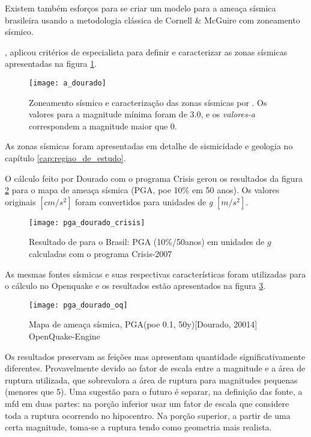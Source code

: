 Existem também esforços \citep{dourado_2014} para se criar um modelo para a ameaça sísmica brasileira
usando a metodologia clássica de Cornell \& McGuire com zoneamento sísmico. 

\citet{dourado_2014}, aplicou critérios de especialista para definir e caracterizar as zonas sísmicas
apresentadas na figura \ref{fig:a_dourado}.

\begin{figure}[H]
  \centering
  \texttt{[image: a\_dourado]} 
  \caption{Zoneamento sísmico e caracterização das zonas sísmicas por \citep{dourado_2014}.
  Os valores para a magnitude mínima foram de 3.0, e os \emph{valores-a} correspondem a magnitude maior que 0.}
  \label{fig:a_dourado} 
\end{figure}

As zonas sísmicas foram apresentadas em detalhe de sismicidade e geologia no capítulo \ref{cap:regiao_de_estudo}.

O cálculo feito por Dourado com o programa Crisis \citep{crisis_2007} gerou os resultados da figura \ref{fig:pga_dourado}
para o mapa de ameaça sísmica (PGA, poe 10\% em 50 anos). Os valores originais  $[cm/s^2]$ foram convertidos
para unidades de \emph{g} $[m/s^2]$.

\begin{figure}[H]
  \centering
  \texttt{[image: pga\_dourado\_crisis]} 
  \caption{Resultado de \citet{dourado_2014} para o Brasil: PGA (10\%/50anos) em unidades de $g$ calculadas com o programa
  Crisis-2007}
  \label{fig:pga_dourado} 
\end{figure}

As mesmas fontes sísmicas e suas respectivas características foram utilizadas para o cálculo no
Openquake e os resultados estão apresentados na figura \ref{fig:pga_dourado_oq}.

\begin{figure}[H]
  \centering
  \texttt{[image: pga\_dourado\_oq]} 
  \caption{Mapa de ameaça sísmica, PGA(poe 0.1, 50y)[Dourado, 20014] OpenQuake-Engine }
  \label{fig:pga_dourado_oq} 
\end{figure}

Os resultados preservam as feições mas apresentam quantidade significativamente diferentes.
Provavelmente devido ao fator de escala entre a magnitude e a área de ruptura utilizada,
que sobrevalora a área de ruptura para magnitudes pequenas (menores que 5). Uma sugestão
para o futuro é separar, na definição das fonte, a \gls{mfd} em duas partes: na porção inferior
usar um fator de escala que considere toda a ruptura ocorrendo no hipocentro. Na porção superior,
a partir de uma certa magnitude, toma-se a ruptura tendo como geometria mais realista.



